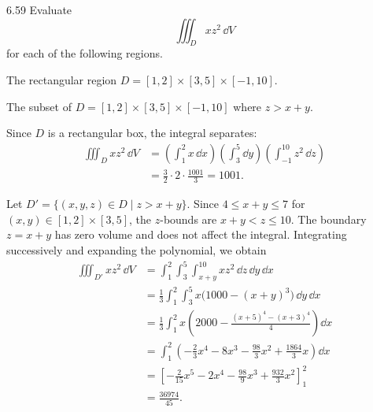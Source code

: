 \documentclass[11pt,oneside]{article}
\begin{document}
\begin{problem}{6.59}
Evaluate
\[
    \iiint_D xz^2\,\dd V
\]
for each of the following regions.
\begin{problemsubparts}
    \item The rectangular region $D=[1, 2]\times[3, 5]\times[-1, 10]$.
    \item The subset of $D=[1, 2]\times[3, 5]\times[-1, 10]$
          where $z>x+y$.
\end{problemsubparts}
\end{problem}
\begin{solution}
\begin{problemsubparts}
    \item Since $D$ is a rectangular box, the integral separates:
    \[
    \begin{aligned}
        \iiint_D xz^2\,\dd V
        &=\left(\int_1^2x\,\dd x\right)
          \left(\int_3^5\dd y\right)
          \left(\int_{-1}^{10}z^2\,\dd z\right)\\
        &=\frac32\cdot2\cdot\frac{1001}{3}
         =\boxed{1001}.
    \end{aligned}
    \]
    \item Let $D'=\{(x, y, z)\in D\mid z>x+y\}$. Since
    $4\le x+y\le7$ for $(x, y)\in[1, 2]\times[3, 5]$,
    the $z$-bounds are $x+y<z\le10$. The boundary $z=x+y$ has
    zero volume and does not affect the integral. Integrating successively
    and expanding the polynomial, we obtain
    \[
    \begin{aligned}
        \iiint_{D'} xz^2\,\dd V
        &=\int_1^2\int_3^5\int_{x+y}^{10}
          xz^2\,\dd z\,\dd y\,\dd x\\
        &=\frac13\int_1^2\int_3^5
          x\bigl(1000-(x+y)^3\bigr)\,\dd y\,\dd x\\
        &=\frac13\int_1^2x\left(
          2000-\frac{(x+5)^4-(x+3)^4}{4}\right)\dd x\\
        &=\int_1^2\left(-\frac23x^4-8x^3
          -\frac{98}{3}x^2+\frac{1864}{3}x\right)\dd x\\
        &=\left[-\frac{2}{15}x^5-2x^4
          -\frac{98}{9}x^3+\frac{932}{3}x^2\right]_1^2\\
        &=\boxed{\frac{36974}{45}}.
    \end{aligned}
    \]
\end{problemsubparts}
\end{solution}
\end{document}
